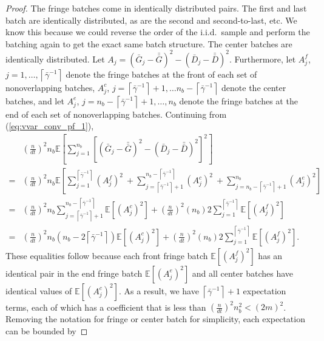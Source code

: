 \documentclass[12pt]{article}
\newcommand{\e}[1]{\mathbb{E} \left[ #1 \right]
}
\newcommand{\gammab}{\bar{\gamma}}
\newcommand{\gb}{\bar{G}}
\newcommand{\gbb}{\bar{\gb}}
\newcommand{\db}{\bar{D}}
\newcommand{\dbb}{\bar{\db}}
\begin{document}
\begin{proof}
	The fringe batches come in identically distributed pairs.  
        The first and last batch are identically distributed, as are the second and second-to-last, etc.  
        We know this because we could reverse the order of the i.i.d.\ sample and perform the batching again to get the exact same batch structure.  
		  The center batches are identically distributed.  
        Let $A_j = (\gb_j - \gbb)^2 - (\db_j - \dbb)^2$.
		  Furthermore, let $A_j^f$, $j=1,\ldots,\left\lceil \gammab^{-1} \right\rceil$ denote the fringe batches at the front of each set of nonoverlapping batches, $A_j^c$, $j=\left\lceil \gammab^{-1} \right\rceil+1, \ldots n_b - \left\lceil \gammab^{-1} \right\rceil$ denote the center batches, and let $A_j^e$, $j=n_b - \left\lceil \gammab^{-1} \right\rceil+1,\ldots,n_b$ denote the fringe batches at the end of each set of nonoverlapping batches. 
		  Continuing from (\ref{eq:vvar_conv_pf_1}),
	\begin{align*}
		& \left( \frac{n}{dt} \right)^2 n_b \e{ \sum_{j=1}^{n_b} \left[ (\gb_j - \gbb)^2 - (\db_j - \dbb)^2 \right]^2 } \\
		 =  & \left( \frac{n}{dt} \right)^2 n_b \e{\sum_{j=1}^{\left\lceil \gammab^{-1} \right\rceil} \left( A_j^f \right)^2 \
		 + \sum_{j=\left\lceil \gammab^{-1} \right\rceil+1}^{n_b-\left\lceil \gammab^{-1} \right\rceil} \left( A_j^c \right)^2 \
		 + \sum_{j=n_b-\left\lceil \gammab^{-1} \right\rceil+1}^{n_b} \left( A_j^e \right)^2 
		} \\
		 = & \left( \frac{n}{dt} \right)^2 n_b \sum_{j=\left\lceil \gammab^{-1} \right\rceil+1}^{n_b-\left\lceil \gammab^{-1} \right\rceil} \e{ \left( A_j^c \right)^2 } + \left( \frac{n}{dt} \right)^2 (n_b) 2\sum_{j=1}^{\left\lceil \gammab^{-1} \right\rceil} \e{ \left( A_j^f \right)^2 } \\
		 = & \left( \frac{n}{dt} \right)^2 n_b \left(n_b - 2\left\lceil \gammab^{-1} \right\rceil \right) \e{ \left( A_j^c \right)^2 }
		+ \left( \frac{n}{dt} \right)^2 (n_b) 2\sum_{j=1}^{\left\lceil \gammab^{-1} \right\rceil} \e{ \left( A_j^f \right)^2 }.
	\end{align*}	
	These equalities follow because each front fringe batch $\e{(A_j^f)^2}$ has an identical pair in the end fringe batch $\e{(A_j^e)^2}$ and all center batches have identical values of $\e{(A_j^c)^2}$.  
	As a result, we have $\left\lceil \gammab^{-1} \right\rceil + 1$ expectation terms, each of which has a coefficient that is less than $\left(\frac{n}{dt}\right)^2n_b^2 < (2m)^2$.  
        Removing the notation for fringe or center batch for simplicity, each expectation can be bounded by

\end{proof}
\end{document}
